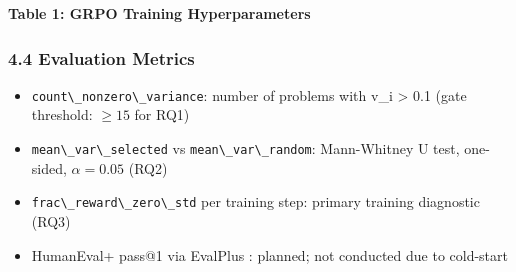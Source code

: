 \textbf{Table 1: GRPO Training Hyperparameters}

\begin{table}[htbp]
\centering
{}
\end{table}

\subsubsection{4.4 Evaluation Metrics}

\begin{itemize}
\item \texttt{count\textbackslash \_nonzero\textbackslash \_variance}: number of problems with v\_i > 0.1 (gate threshold: $\geq 15$ for RQ1)
\item \texttt{mean\textbackslash \_var\textbackslash \_selected} vs \texttt{mean\textbackslash \_var\textbackslash \_random}: Mann-Whitney U test, one-sided, $\alpha =0.05$ (RQ2)
\item \texttt{frac\textbackslash \_reward\textbackslash \_zero\textbackslash \_std} per training step: primary training diagnostic (RQ3)
\item HumanEval+ pass@1 via EvalPlus \citep{Liu2023}: planned; not conducted due to cold-start
\end{itemize}

